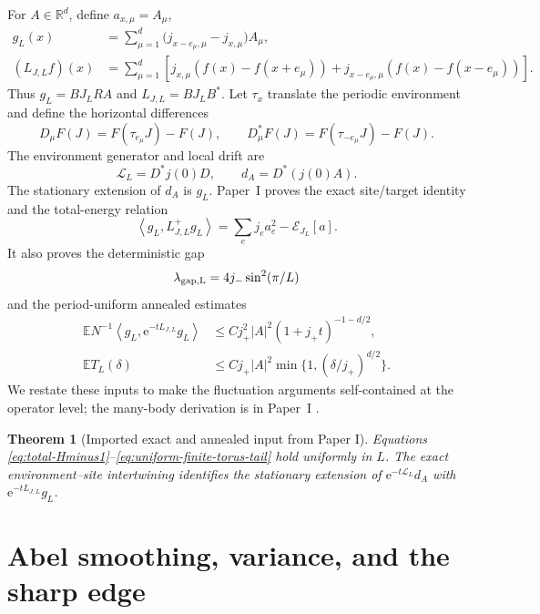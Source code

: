 \documentclass[11pt]{article}
\newtheorem{theorem}{Theorem}[section]
\theoremstyle{definition}
\theoremstyle{remark}
\newcommand{\e}{\mathrm e}
\newcommand{\R}{\mathbb R}
\newcommand{\E}{\mathbb E}
\newcommand{\cE}{\mathcal E}
\newcommand{\ip}[2]{\left\langle #1,#2\right\rangle}
\newcommand{\abs}[1]{\left\lvert #1\right\rvert}
\begin{document}
For $A\in\R^d$, define $a_{x,\mu}=A_\mu$,
\begin{align}
 g_L(x)&=\sum_{\mu=1}^d\bigl(j_{x-e_\mu,\mu}-j_{x,\mu}\bigr)A_\mu,\\
 (L_{J,L}f)(x)&=\sum_{\mu=1}^d\left[j_{x,\mu}(f(x)-f(x+e_\mu))+j_{x-e_\mu,\mu}(f(x)-f(x-e_\mu))\right].
\end{align}
Thus $g_L=BJ_LRA$ and $L_{J,L}=BJ_LB^*$.  Let $\tau_x$ translate the periodic environment and define the horizontal differences
\begin{equation}
 D_\mu F(J)=F(\tau_{e_\mu}J)-F(J),
 \qquad
 D_\mu^*F(J)=F(\tau_{-e_\mu}J)-F(J).
 \end{equation}
The environment generator and local drift are
\begin{equation}
 \mathscr L_L=D^*j(0)D,
 \qquad
 d_A=D^*(j(0)A).
 \label{eq:environment-operator-definition}
\end{equation}
The stationary extension of $d_A$ is $g_L$.  Paper~I proves the exact site/target identity and the total-energy relation
\begin{equation}
 \ip{g_L}{L_{J,L}^+g_L}=\sum_ej_ea_e^2-\cE_{J_L}[a].
 \label{eq:total-Hminus1}
\end{equation}
It also proves the deterministic gap
\begin{equation}
 \lambda_{\rm gap,L}=4j_-\sin^2(\pi/L)
 \label{eq:finite-size-gap}
\end{equation}
and the period-uniform annealed estimates
\begin{align}
 \E N^{-1}\ip{g_L}{\e^{-tL_{J,L}}g_L}
 &\le Cj_+^2\abs A^2(1+j_+t)^{-1-d/2},
 \label{eq:uniform-annealed-heat}\\
 \E T_L(\delta)&\le Cj_+\abs A^2\min\{1,(\delta/j_+)^{d/2}\}.
 \label{eq:uniform-finite-torus-tail}
\end{align}
We restate these inputs to make the fluctuation arguments self-contained at the operator level; the many-body derivation is in Paper~I \cite{Sledgianowski2026RobustnessI}.

\begin{theorem}[Imported exact and annealed input from Paper I]
\label{thm:quantitative-finite-torus}
Equations \eqref{eq:total-Hminus1}--\eqref{eq:uniform-finite-torus-tail} hold uniformly in $L$.  The exact environment--site intertwining identifies the stationary extension of $\e^{-t\mathscr L_L}d_A$ with $\e^{-tL_{J,L}}g_L$.
\end{theorem}
\section{Abel smoothing, variance, and the sharp edge}
\label{sec:quenched-fluctuations}
\end{document}

